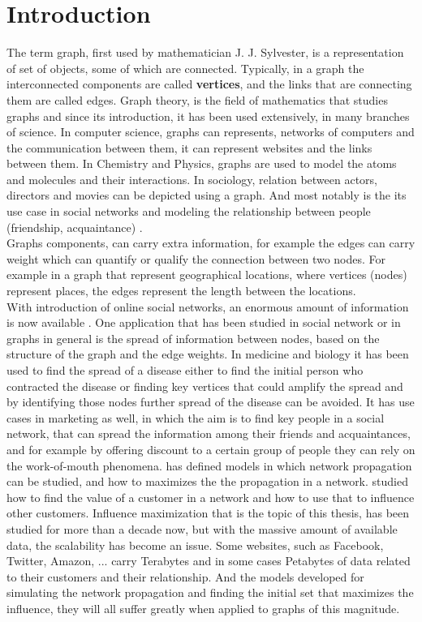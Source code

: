 \documentclass[english]{tktltiki}
\begin{document}
\section{Introduction}
The term graph, first used by mathematician J. J. Sylvester, is a representation of set of objects, some of which are connected. Typically, in a graph the interconnected components are called \textbf{vertices}, and the links that are connecting them are called edges. Graph theory, is the field of mathematics that studies graphs and since its introduction, it has been used extensively, in many branches of science. In computer science, graphs can represents, networks of computers and the communication between them, it can represent websites and the links between them. In Chemistry and Physics, graphs are used to model the atoms and molecules and their interactions. In sociology, relation between actors, directors and movies can be depicted using a graph. And most notably is the its use case in social networks and modeling the relationship between people (friendship, acquaintance) . \\
Graphs components, can carry extra information, for example the edges can carry weight which can quantify or qualify the connection between two nodes. For example in a graph that represent geographical locations, where vertices (nodes) represent places, the edges represent the length between the locations. \\
With introduction of online social networks, an enormous amount of information is now available . One application that has been studied in social network or in graphs in general is the spread of information between nodes, based on the structure of the graph and the edge weights. In medicine and biology it has been used to find the spread of a disease either to find the initial person who contracted the disease or finding key vertices that could amplify the spread and by identifying those nodes further spread of the disease can be avoided. It has use cases in marketing as well, in which the aim is to find key people in a social network, that can spread the information among their friends and acquaintances, and for example by offering discount to a certain group of people they can rely on the work-of-mouth phenomena. \cite{kempe03} has defined models in which network propagation can be studied, and how to maximizes the the propagation in a network. \cite{domingo01} studied how to find the value of a customer in a network and how to use that to influence other customers. Influence maximization that is the topic of this thesis, has been studied for more than a decade now, but with the massive amount of available data, the scalability has become an issue. Some websites, such as Facebook, Twitter, Amazon, ... carry Terabytes and in some cases Petabytes of data related to their customers and their relationship. And the models developed for simulating the network propagation and finding the initial set that maximizes the influence, they will all suffer greatly when applied to graphs of this magnitude. \\
\end{document}
